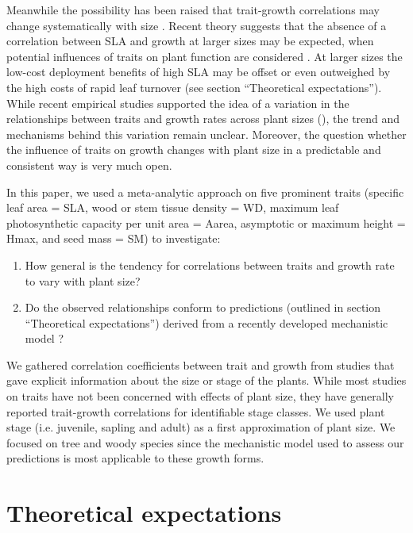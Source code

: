 \documentclass[a4paper,11pt]{article}
\begin{document}
Meanwhile the possibility has been raised that trait-growth correlations may change systematically with size \citep{Falster:2011ii, Ruger:2012jv, Iida:2014ep, Iida:2014hq}. Recent theory suggests that the absence of a correlation between SLA and growth at larger sizes may be expected, when potential influences of traits on plant function are considered \citep{Falster:2011ii}. At larger sizes the low-cost deployment benefits of high SLA may be offset or even outweighed by the high costs of rapid leaf turnover (see section ``Theoretical expectations''). While recent empirical studies supported the idea of a variation in the relationships between traits and growth rates across plant sizes (\citealt{Iida:2014ep, Iida:2014hq}), the trend and mechanisms behind this variation remain unclear. Moreover, the question whether the influence of traits on growth changes with plant size in a predictable and consistent way is very much open.

In this paper, we used a meta-analytic approach on five prominent traits (specific leaf area = SLA, wood or stem tissue density = WD, maximum leaf photosynthetic capacity per unit area = Aarea, asymptotic or maximum height = Hmax, and seed mass = SM) to investigate:
\begin{enumerate}
  \item How general is the tendency for correlations between traits and growth rate to vary with plant size?
  \item  Do the observed relationships conform to predictions (outlined in section ``Theoretical expectations'') derived from a recently developed mechanistic model \citep{Falster:2011ii}?
\end{enumerate}
We gathered correlation coefficients between trait and growth from studies that gave explicit information about the size or stage of the plants. While most studies on traits have not been concerned with effects of plant size, they have generally reported trait-growth correlations for identifiable stage classes. We used plant stage (i.e. juvenile, sapling and adult) as a first approximation of plant size. We focused on tree and woody species since the mechanistic model used to assess our predictions is most applicable to these growth forms.

\section*{Theoretical expectations}\label{theory}
\end{document}
